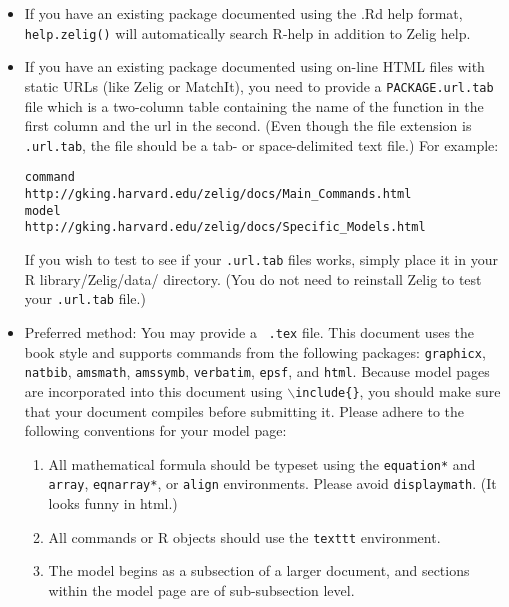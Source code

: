 \begin{description}
\begin{itemize}

	\item If you have an existing package documented using the .Rd help format, {\tt help.zelig()} will automatically search R-help in addition to Zelig help.

	\item If you have an existing package documented using on-line HTML files with static URLs (like Zelig or MatchIt), you need to provide a {\tt PACKAGE.url.tab} file which is a two-column table containing the name of the function in the first column and the url in the second.  (Even though the file extension is {\tt .url.tab}, the file should be a tab- or space-delimited text file.)  For example:  

\begin{verbatim}
command       http://gking.harvard.edu/zelig/docs/Main_Commands.html
model         http://gking.harvard.edu/zelig/docs/Specific_Models.html
\end{verbatim}


If you wish to test to see if your {\tt .url.tab} files works, simply place it in your R library/Zelig/data/ directory.  (You do not need to reinstall Zelig to test your {\tt .url.tab} file.)

	\item Preferred method:  You may provide a \LaTeXe\ {\tt .tex} file.  This document uses the book style and supports commands from the following packages:
  {\tt graphicx}, {\tt natbib}, {\tt amsmath}, {\tt amssymb}, {\tt verbatim}, {\tt epsf}, and {\tt html}.  Because model pages are incorporated into this document using {\tt $\backslash$include\{\}}, you should make sure that your document compiles before submitting it.  Please adhere to the following conventions for your model page: 

  \begin{enumerate}

  	\item All mathematical formula should be typeset using the {\tt equation*} and {\tt array}, {\tt eqnarray*}, or {\tt align} environments.  Please avoid {\tt displaymath}.  (It looks funny in html.)

	  \item All commands or R objects should use the {\tt texttt} environment.

  	\item The model begins as a subsection of a larger document, and sections within the model page are of sub-subsection level.


\end{enumerate}
\end{itemize}
\end{description}
